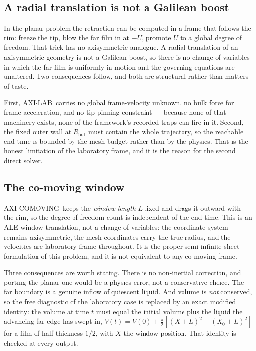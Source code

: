 \documentclass[11pt,a4paper]{article}
\newcommand{\LAB}{\textsf{AXI-LAB}}
\newcommand{\COM}{\textsf{AXI-COMOVING}}
\begin{document}
\subsection{A radial translation is not a Galilean boost}
\label{sec:frame}

In the planar problem the retraction can be computed in a frame that follows the
rim: freeze the tip, blow the far film in at $-U$, promote $U$ to a global
degree of freedom. That trick has no axisymmetric analogue. A radial
translation of an axisymmetric geometry is not a Galilean boost, so there is no
change of variables in which the far film is uniformly in motion and the
governing equations are unaltered. Two consequences follow, and both are
structural rather than matters of taste.

First, \LAB\ carries no global frame-velocity unknown, no bulk force for frame
acceleration, and no tip-pinning constraint --- because none of that machinery
exists, none of the framework's recorded traps can fire in it. Second, the fixed
outer wall at $R_{\mathrm{out}}$ must contain the whole trajectory, so the
reachable end time is bounded by the mesh budget rather than by the physics.
That is the honest limitation of the laboratory frame, and it is the reason for
the second direct solver.

\subsection{The co-moving window}
\label{sec:comoving}

\COM\ keeps the \emph{window length} $L$ fixed and drags it outward with the
rim, so the degree-of-freedom count is independent of the end time. This is an
ALE window translation, not a change of variables: the coordinate system remains
axisymmetric, the mesh coordinates carry the true radius, and the velocities are
laboratory-frame throughout. It is the proper semi-infinite-sheet formulation of
this problem, and it is not equivalent to any co-moving frame.

Three consequences are worth stating. There is no non-inertial correction, and
porting the planar one would be a physics error, not a conservative choice. The
far boundary is a genuine inflow of quiescent liquid. And volume is
\emph{not} conserved, so the free diagnostic of the laboratory case is replaced
by an exact modified identity: the volume at time $t$ must equal the initial
volume plus the liquid the advancing far edge has swept in,
$V(t) = V(0) + \tfrac{\pi}{2}\left[(X+L)^{2}-(X_{0}+L)^{2}\right]$ for a film of
half-thickness $1/2$, with $X$ the window position. That identity is checked at
every output.
\end{document}
